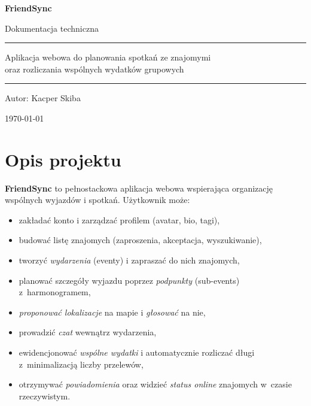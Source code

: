\documentclass[11pt,a4paper]{article}
\begin{document}
\begin{titlepage}
    \centering
    \vspace*{2cm}

    {\Huge\bfseries FriendSync\par}
    \vspace{0.5cm}
    {\Large Dokumentacja techniczna\par}

    \vspace{1.5cm}
    \rule{0.7\textwidth}{0.4pt}\par
    \vspace{0.5cm}
    {\large Aplikacja webowa do planowania spotkań ze znajomymi\\
    oraz rozliczania wspólnych wydatków grupowych\par}
    \vspace{0.5cm}
    \rule{0.7\textwidth}{0.4pt}\par

    \vfill

    {\large Autor: Kacper Skiba\par}
    \vspace{0.3cm}
    {\large \today\par}
\end{titlepage}

\tableofcontents
\newpage

\section{Opis projektu}

\textbf{FriendSync} to pełnostackowa aplikacja webowa wspierająca organizację wspólnych
wyjazdów i spotkań. Użytkownik może:

\begin{itemize}[noitemsep]
    \item zakładać konto i zarządzać profilem (avatar, bio, tagi),
    \item budować listę znajomych (zaproszenia, akceptacja, wyszukiwanie),
    \item tworzyć \emph{wydarzenia} (eventy) i zapraszać do nich znajomych,
    \item planować szczegóły wyjazdu poprzez \emph{podpunkty} (sub-events) z~harmonogramem,
    \item \emph{proponować lokalizacje} na mapie i \emph{głosować} na nie,
    \item prowadzić \emph{czat} wewnątrz wydarzenia,
    \item ewidencjonować \emph{wspólne wydatki} i automatycznie rozliczać długi
          z~minimalizacją liczby przelewów,
    \item otrzymywać \emph{powiadomienia} oraz widzieć \emph{status online} znajomych
          w~czasie rzeczywistym.
\end{itemize}
\end{document}

